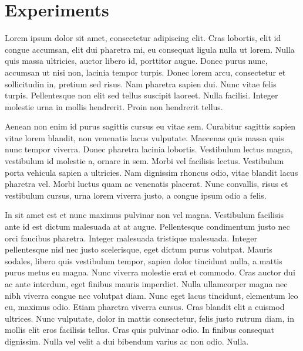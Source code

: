 \documentclass[a4paper]{article}
\begin{document}
\section{Experiments}


Lorem ipsum dolor sit amet, consectetur adipiscing elit. Cras lobortis, elit id congue accumsan, elit dui pharetra mi, eu consequat ligula nulla ut lorem. Nulla quis massa ultricies, auctor libero id, porttitor augue. Donec purus nunc, accumsan ut nisi non, lacinia tempor turpis. Donec lorem arcu, consectetur et sollicitudin in, pretium sed risus. Nam pharetra sapien dui. Nunc vitae felis turpis. Pellentesque non elit sed tellus suscipit laoreet. Nulla facilisi. Integer molestie urna in mollis hendrerit. Proin non hendrerit tellus.

Aenean non enim id purus sagittis cursus eu vitae sem. Curabitur sagittis sapien vitae lorem blandit, non venenatis lacus vulputate. Maecenas quis massa quis nunc tempor viverra. Donec pharetra lacinia lobortis. Vestibulum lectus magna, vestibulum id molestie a, ornare in sem. Morbi vel facilisis lectus. Vestibulum porta vehicula sapien a ultricies. Nam dignissim rhoncus odio, vitae blandit lacus pharetra vel. Morbi luctus quam ac venenatis placerat. Nunc convallis, risus et vestibulum cursus, urna lorem viverra justo, a congue ipsum odio a felis.

In sit amet est et nunc maximus pulvinar non vel magna. Vestibulum facilisis ante id est dictum malesuada at at augue. Pellentesque condimentum justo nec orci faucibus pharetra. Integer malesuada tristique malesuada. Integer pellentesque nisl nec justo scelerisque, eget dictum purus volutpat. Mauris sodales, libero quis vestibulum tempor, sapien dolor tincidunt nulla, a mattis purus metus eu magna. Nunc viverra molestie erat et commodo. Cras auctor dui ac ante interdum, eget finibus mauris imperdiet. Nulla ullamcorper magna nec nibh viverra congue nec volutpat diam. Nunc eget lacus tincidunt, elementum leo eu, maximus odio. Etiam pharetra viverra cursus. Cras blandit elit a euismod ultrices. Nunc vulputate, dolor in mattis consectetur, felis justo rutrum diam, in mollis elit eros facilisis tellus. Cras quis pulvinar odio. In finibus consequat dignissim. Nulla vel velit a dui bibendum varius ac non odio. Nulla.
\end{document}
